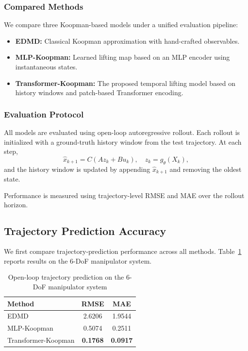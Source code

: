 \documentclass[journal]{IEEEtran}
\begin{document}
\subsubsection{Compared Methods}

We compare three Koopman-based models under a unified evaluation pipeline:
\begin{itemize}
    \item \textbf{EDMD:} Classical Koopman approximation with hand-crafted observables.
    \item \textbf{MLP-Koopman:} Learned lifting map based on an MLP encoder using instantaneous states.
    \item \textbf{Transformer-Koopman:} The proposed temporal lifting model based on history windows and patch-based Transformer encoding.
\end{itemize}

\subsubsection{Evaluation Protocol}
\label{sec:eval_protocol}

All models are evaluated using open-loop autoregressive rollout. Each rollout is initialized with a ground-truth history window from the test trajectory. At each step,
\begin{equation}
    \hat{x}_{k+1} = C(A z_k + B u_k), \quad z_k = g_\theta(X_k),
\end{equation}
and the history window is updated by appending $\hat{x}_{k+1}$ and removing the oldest state.

Performance is measured using trajectory-level RMSE and MAE over the rollout horizon.

\subsection{Trajectory Prediction Accuracy}

We first compare trajectory-prediction performance across all methods. Table~\ref{tab:prediction_platform_a} reports results on the 6-DoF manipulator system.

\begin{table}[!t]
\renewcommand{\arraystretch}{1.2}
\caption{Open-loop trajectory prediction on the 6-DoF manipulator system}
\label{tab:prediction_platform_a}
\centering
\begin{tabular}{lcc}
\toprule
Method & RMSE & MAE \\
\midrule
EDMD & 2.6206 & 1.9544 \\
MLP-Koopman & 0.5074 & 0.2511 \\
Transformer-Koopman & \textbf{0.1768} & \textbf{0.0917} \\
\bottomrule
\end{tabular}
\end{table}
\end{document}
